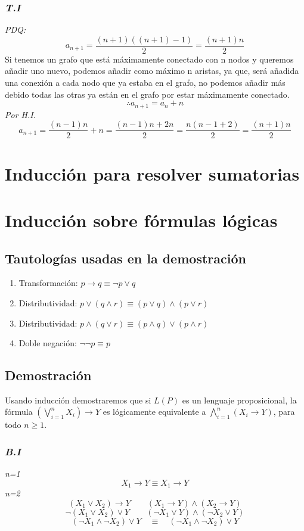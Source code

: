 \documentclass{article}
\begin{document}
\subsubsection*{\emph{T.I}}
\emph{PDQ:}
\[ a_{n+1} = \frac{(n+1)((n+1) - 1)}{2} = \frac{(n+1)n}{2} \]
Si tenemos un grafo que está máximamente conectado con n nodos y queremos añadir
uno nuevo, podemos añadir como máximo n aristas, ya que, será añadida una conexión a 
cada nodo que ya estaba en el grafo, no podemos añadir más debido todas las otras 
ya están en el grafo por estar máximamente conectado.
\[ \therefore a_{n+1} = a_n + n \]
\emph{Por H.I.}
\[ a_{n+1} = \frac{(n-1)n}{2} + n = \frac{(n-1)n + 2n}{2} = \frac{n(n-1+2)}{2} = \frac{(n+1)n}{2} \]


\section{Inducción para resolver sumatorias}

\section{Inducción sobre fórmulas lógicas}
\subsection{Tautologías usadas en la demostración}
\begin{enumerate}
  \item Transformación:  $p \rightarrow q \equiv \neg p \lor q$
  \item Distributividad: $p \lor (q \land r) \equiv (p \lor q) \land (p \lor r)$
  \item Distributividad: $p \land (q \lor r) \equiv (p \land q) \lor (p \land r)$
  \item Doble negación: $\neg\neg p \equiv p$
\end{enumerate}

\subsection{Demostración}
Usando inducción demostraremos que si $L(P)$ es un lenguaje proposicional, la fórmula $(\bigvee _{i=1}^{n} X_i) \rightarrow Y $ es lógicamente equivalente a $\bigwedge _{i=1}^{n} (X_i \rightarrow Y)$,
para todo $n \ge 1$.
\subsubsection*{\emph{B.I}}
\emph{n=1}
\[X_1 \rightarrow Y \equiv X_1 \rightarrow Y\]
\emph{n=2}
\[(X_1 \lor X_2) \rightarrow Y \qquad (X_1 \rightarrow Y) \land (X_2 \rightarrow Y) \]
\[\neg(X_1 \lor X_2) \lor Y \qquad (\neg X_1 \lor Y) \land (\neg X_2 \lor Y) \]
\[(\neg X_1 \land \neg X_2) \lor Y \quad \equiv \quad (\neg X_1 \land \neg X_2) \lor Y \]
\end{document}
